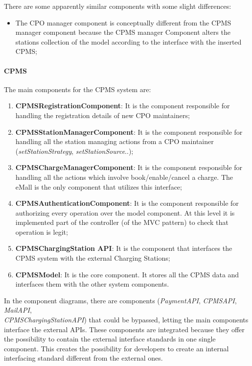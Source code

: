 There are some apparently similar components with some slight differences:
\begin{itemize}
    \item The \ac{CPO} manager component is conceptually different from the \ac{CPMS} manager component because the CPMS manager Component alters the stations collection of the model according to the interface with the inserted \ac{CPMS};
\end{itemize}
\paragraph{\textbf{\ac{CPMS}}}
The main components for the \ac{CPMS} system are:
\begin{enumerate}[label=\textbf{CPMS\arabic*}]
    \item \textbf{\ac{CPMS}RegistrationComponent}: It is the component responsible for handling the registration details of new \ac{CPO} maintainers;\label{CPMSRegistrationComponent}
    \item \textbf{\ac{CPMS}StationManagerComponent}: It is the component responsible for handling all the station managing actions from a \ac{CPO} maintainer (\textit{setStationStrategy}, \textit{setStationSource}..);\label{CPMSStationManagerComponent}
    \item \textbf{\ac{CPMS}ChargeManagerComponent}: It is the component responsible for handling all the actions which involve book/enable/cancel a charge. The \ac{eMall} is the only component that utilizes this interface;\label{CPMSChargeManagerComponent}
    \item \textbf{\ac{CPMS}AuthenticationComponent}: It is the component responsible for authorizing every operation over the model component. At this level it is implemented part of the controller (of the \ac{MVC} pattern) to check that operation is legit;\label{CPMSAuthenticationComponent}
    \item \textbf{\ac{CPMS}ChargingStation \ac{API}}: It is the component that interfaces the \ac{CPMS} system with the external Charging Stations;\label{CPMSChargingStation}
    \item \textbf{\ac{CPMS}Model}: It is the core component. It stores all the \ac{CPMS} data and interfaces them with the other system components.\label{CPMSModel}
\end{enumerate}
In the component diagrams, there are components (\textit{Payment\ac{API}}, \textit{\ac{CPMS}\ac{API}}, \textit{Mail\ac{API}}, \\\textit{\ac{CPMS}ChargingStationAPI}) that could be bypassed, letting the main components interface the external \acp{API}. These components are integrated because they offer the possibility to contain the external interface standards in one single component. This creates the possibility for developers to create an internal interfacing standard different from the external ones.

